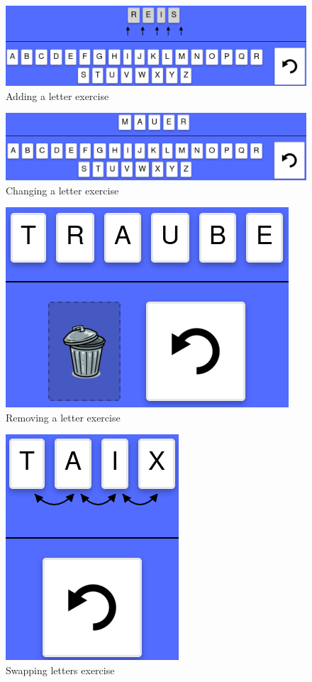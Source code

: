 \begin{figure} 
  \centering
  \includegraphics[width=1.0 \columnwidth]{figures/words_add.png}
  \caption{Adding a letter exercise} 
  \label{fig:addingLetter} 
\end{figure}

\begin{figure} 
  \centering
  \includegraphics[width=1.0 \columnwidth]{figures/words_change.png}
  \caption{Changing a letter exercise} 
  \label{fig:changingLetter} 
\end{figure}

\begin{figure} 
  \centering
  \includegraphics[width=0.3 \columnwidth]{figures/words_remove.png}
  \caption{Removing a letter exercise} 
  \label{fig:removingLetter} 
\end{figure}

\begin{figure} 
  \centering
  \includegraphics[width=0.2 \columnwidth]{figures/words_swap.png}
  \caption{Swapping letters exercise} 
  \label{fig:swappingLetters} 
\end{figure}

